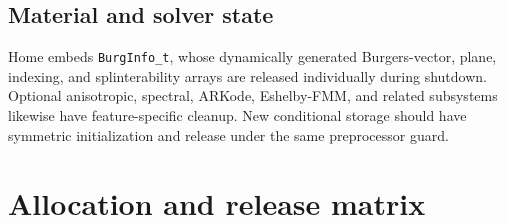 \documentclass[11pt]{article}
\newcommand{\code}[1]{\texorpdfstring{\nolinkurl{#1}}{#1}}
\begin{document}
\subsection{Material and solver state}

Home embeds \code{BurgInfo_t}, whose dynamically generated Burgers-vector,
plane, indexing, and splinterability arrays are released individually during
shutdown.  Optional anisotropic, spectral, ARKode, Eshelby-FMM, and related
subsystems likewise have feature-specific cleanup.  New conditional storage
should have symmetric initialization and release under the same preprocessor
guard.

\section{Allocation and release matrix}
\end{document}
